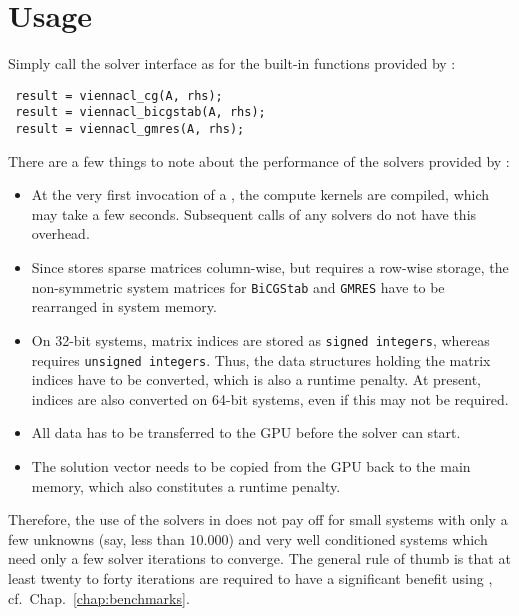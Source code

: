 \section{Usage} \label{sec:usage}
Simply call the {\ViennaCL} solver interface as for the built-in functions provided by {\MATLAB}:
\begin{lstlisting}
 result = viennacl_cg(A, rhs);
 result = viennacl_bicgstab(A, rhs);
 result = viennacl_gmres(A, rhs);
\end{lstlisting}

There are a few things to note about the performance of the solvers provided by {\ViennaCL}:
\begin{itemize}
 \item At the very first invocation of a {\ViennaCL}, the {\OpenCL} compute kernels are compiled, which may take a few seconds. Subsequent calls of any {\ViennaCL} solvers do not have this overhead.
 \item Since {\MATLAB} stores sparse matrices column-wise, but {\ViennaCL} requires a row-wise storage, the non-symmetric system matrices for \texttt{BiCGStab} and \texttt{GMRES} have to be rearranged in system memory.
 \item On 32-bit systems, matrix indices are stored as \texttt{signed integers}, whereas {\ViennaCL} requires \texttt{unsigned integers}. Thus, the data structures holding the matrix indices have to be converted, which is also a runtime penalty. At present, indices are also converted on 64-bit systems, even if this may not be required.
 \item All data has to be transferred to the GPU before the solver can start.
 \item The solution vector needs to be copied from the GPU back to the main memory, which also constitutes a runtime penalty.
\end{itemize}
Therefore, the use of the {\ViennaCL} solvers in {\MATLAB} does not pay off for small systems with only a few unknowns (say, less than $10.000$) and very well conditioned systems which need only a few solver iterations to converge. The general rule of thumb is that at least twenty to forty iterations are required to have a significant benefit using {\ViennaCL}, cf.~Chap.~\ref{chap:benchmarks}.

